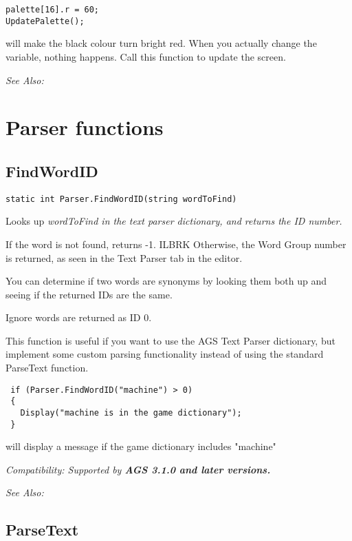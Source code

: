 \begin{verbatim}
palette[16].r = 60;
UpdatePalette();
\end{verbatim}
will make the black colour turn bright red. When you actually change the variable, nothing happens. Call this function to update the screen.

\it{See Also:} 


\section{Parser functions}%


\subsection{FindWordID}\label{Parser.FindWordID}%

\begin{verbatim}
static int Parser.FindWordID(string wordToFind)
\end{verbatim}
Looks up \it{wordToFind} in the text parser dictionary, and returns the ID number.

If the word is not found, returns -1. ILBRK
Otherwise, the Word Group number is returned, as seen in the Text Parser tab in the editor.

You can determine if two words are synonyms by looking them both up and seeing if the
returned IDs are the same.

Ignore words are returned as ID 0.

This function is useful if you want to use the AGS Text Parser dictionary, but implement
some custom parsing functionality instead of using the standard ParseText function.

\begin{verbatim}
 if (Parser.FindWordID("machine") > 0)
 {
   Display("machine is in the game dictionary");
 }
\end{verbatim}
will display a message if the game dictionary includes "machine"

\it{Compatibility:} Supported by \bf{AGS 3.1.0} and later versions.

\it{See Also:} 


\subsection{ParseText}\label{Parser.ParseText}%

